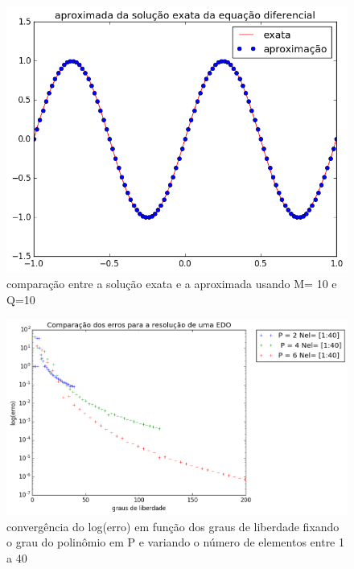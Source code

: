 \begin{figure}[!ht]
  \includegraphics[width=1\textwidth,center]{figuras/solu_edo_simul.png}
  \caption{comparação entre a solução exata e a aproximada usando M= 10 e Q=10}
\end{figure}

\begin{figure}[!hb]
  \includegraphics[width=1\textwidth,center]{figuras/convergencia_erro_EDO.png}
  \caption{convergência do log(erro) em função dos graus de liberdade fixando o grau do polinômio em P e variando o número de elementos entre 1 a 40 }
\end{figure}

